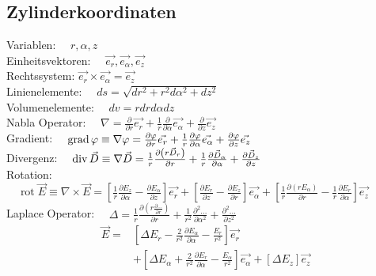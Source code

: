 \subsection{Zylinderkoordinaten}
Variablen:          $\quad r, \alpha, z$\\
Einheitsvektoren:   $\quad \vec{e_{r}}, \vec{e_{\alpha}}, \vec{e_{z}} \quad$\\
Rechtssystem: $\vec{e_{r}} \times \vec{e_{\alpha}}=\vec{e_{z}}$\\
Linienelemente:     $\quad d s=\sqrt{d r^{2}+r^{2} d \alpha^{2}+d z^{2}}$\\
Volumenelemente:    $\quad d v=r d r d \alpha d z$\\
Nabla Operator:     $\quad \nabla=\frac{\partial}{\partial r} \vec{e_{r}}+\frac{1}{r} \frac{\partial}{\partial \alpha} \vec{e_{\alpha}}+\frac{\partial}{\partial z} \vec{e_{z}}$\\
Gradient:           $\quad \operatorname{grad} \varphi \equiv \nabla \varphi=\frac{\partial \varphi}{\partial r} \vec{e_{r}}+\frac{1}{r} \frac{\partial \varphi}{\partial \alpha} \vec{e_{\alpha}}+\frac{\partial \varphi}{\partial z} \vec{e_{z}}$\\
Divergenz:          $\quad \operatorname{div} \vec{D} \equiv \nabla \vec{D}=\frac{1}{r} \frac{\partial\left(r \vec{D}_{r}\right)}{\partial r}+\frac{1}{r} \frac{\partial \vec{D}_{\alpha}}{\partial \alpha}+\frac{\partial \vec{D}_{z}}{\partial z}$\\
Rotation:           $\quad \operatorname{rot} \vec{E} \equiv \nabla \times \vec{E}=\left[\frac{1}{r} \frac{\partial E_{z}}{\partial \alpha}-\frac{\partial E_{\alpha}}{\partial z}\right] \vec{e_{r}}+\left[\frac{\partial E_{r}}{\partial z}-\frac{\partial E_{z}}{\partial r}\right] \vec{e_{\alpha}}+\left[\frac{1}{r} \frac{\partial\left(r E_{\alpha}\right)}{\partial r}-\frac{1}{r} \frac{\partial E_{r}}{\partial \alpha}\right] \vec{e_{z}}$\\
Laplace Operator:   $\quad \Delta = \frac{1}{r}\frac{\partial \left(r \frac{\partial \ldots}{\partial r}\right)}{\partial r} + \frac{1}{r^2}\frac{\partial^2 \ldots}{\partial \alpha^2} + \frac{\partial^2 \ldots}{\partial z^2}$\\
\begin{align*}
    \vec{E} =& \left[\Delta E_{r}-\frac{2}{r^{2}} \frac{\partial E_{\alpha}}{\partial \alpha}-\frac{E_{r}}{r^{2}}\right] \vec{e_{r}}\\
             &+\left[\Delta E_{\alpha}+\frac{2}{r^{2}} \frac{\partial E_{r}}{\partial \alpha}-\frac{E_{\alpha}}{r^{2}}\right] \vec{e_{\alpha}}+\left[\Delta E_{z}\right] \vec{e_{z}}
\end{align*}


